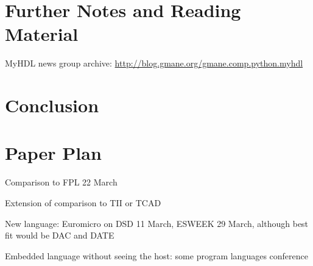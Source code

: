 \documentclass[10pt, conference, compsocconf]{IEEEtran}
\newcommand{\comment}[3]{\paragraph*{\textbf{#1}}{\color{#3}#2}}
\newcommand{\martin}[1]{\comment{Martin}{#1}{Blue}}
\begin{document}
\section{Further Notes and Reading Material}

MyHDL news group archive: \url{http://blog.gmane.org/gmane.comp.python.myhdl}


% 



\section{Conclusion}
\label{sec:conclusion}






\section{Paper Plan}

Comparison to FPL 22 March

Extension of comparison to TII or TCAD

New language: Euromicro on DSD 11 March, ESWEEK 29 March, although best fit would be DAC and DATE

Embedded language without seeing the host: some program languages conference
\end{document}
